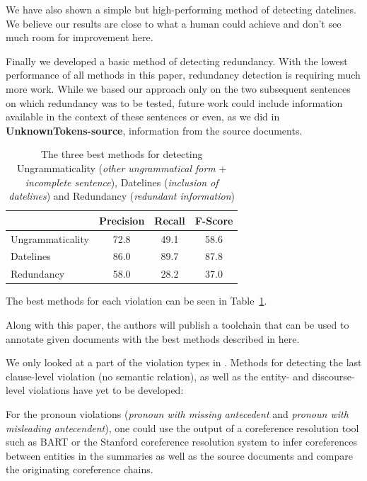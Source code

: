 \documentclass[a4paper,10pt]{scrartcl}
\theoremstyle{style}
\begin{document}
We have also shown a simple but high-performing method of detecting datelines. We believe our results are close to what a human could achieve and don't see much room for improvement here.

Finally we developed a basic method of detecting redundancy. With the lowest performance of all methods in this paper, redundancy detection is requiring much more work. While we based our approach only on the two subsequent sentences on which redundancy was to be tested, future work could include information available in the context of these sentences or even, as we did in \textbf{UnknownTokens-source}, information from the source documents.

\begin{table}
\begin{center}
\begin{tabular}{|l|c|c|c|}
  \hline
   & Precision & Recall & F-Score\\
  \hline
  Ungrammaticality & 72.8 & 49.1 & 58.6\\
  \hline
  Datelines & 86.0 & 89.7 & 87.8\\
  \hline
  Redundancy & 58.0 & 28.2 & 37.0\\
  \hline
  \end{tabular}
\end{center}
\label{eval_best}
\caption{The three best methods for detecting Ungrammaticality (\textit{other ungrammatical form} + \textit{incomplete sentence}), Datelines (\textit{inclusion of datelines}) and Redundancy (\textit{redundant information})}
\end{table}

The best methods for each violation can be seen in Table~\ref{eval_best}.

Along with this paper, the authors will publish a toolchain that can be used to annotate given documents with the best methods described in here.

We only looked at a part of the violation types in \cite{friedrichlqvsumm}. Methods for detecting the last clause-level violation (no semantic relation), as well as the entity- and discourse-level violations have yet to be developed:

For the pronoun violations (\textit{pronoun with missing antecedent} and \textit{pronoun with misleading antecendent}), one could use the output of a coreference resolution tool such as BART \citep{versley2008bart} or the Stanford coreference resolution system \citep{lee2011stanford} to infer coreferences between entities in the summaries as well as the source documents and compare the originating coreference chains.
\end{document}
